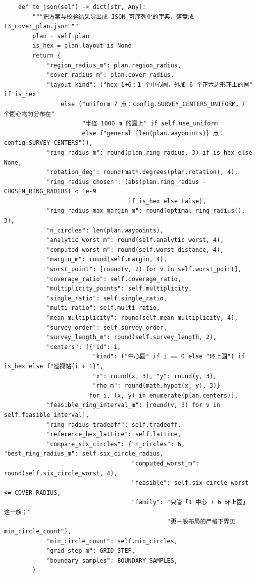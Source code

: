 \documentclass[UTF8, zihao=5,AutoFakeBold=2]{ctexart}
\begin{document}
\begin{lstlisting}
    def to_json(self) -> dict[str, Any]:
        """把方案与校验结果导出成 JSON 可序列化的字典，落盘成 t3_cover_plan.json"""
        plan = self.plan
        is_hex = plan.layout is None
        return {
            "region_radius_m": plan.region_radius,
            "cover_radius_m": plan.cover_radius,
            "layout_kind": ("hex 1+6：1 个中心圆，外加 6 个正六边形环上的圆" if is_hex
                else ("uniform 7 点：config.SURVEY_CENTERS_UNIFORM，7 个圆心均匀分布在"
                      "半径 1000 m 的圆上" if self.use_uniform
                      else f"general {len(plan.waypoints)} 点：config.SURVEY_CENTERS")),
            "ring_radius_m": round(plan.ring_radius, 3) if is_hex else None,
            "rotation_deg": round(math.degrees(plan.rotation), 4),
            "ring_radius_chosen": (abs(plan.ring_radius - CHOSEN_RING_RADIUS) < 1e-9
                                   if is_hex else False),
            "ring_radius_max_margin_m": round(optimal_ring_radius(), 3),
            "n_circles": len(plan.waypoints),
            "analytic_worst_m": round(self.analytic_worst, 4),
            "computed_worst_m": round(self.worst_distance, 4),
            "margin_m": round(self.margin, 4),
            "worst_point": [round(v, 2) for v in self.worst_point],
            "coverage_ratio": self.coverage_ratio,
            "multiplicity_points": self.multiplicity,
            "single_ratio": self.single_ratio,
            "multi_ratio": self.multi_ratio,
            "mean_multiplicity": round(self.mean_multiplicity, 4),
            "survey_order": self.survey_order,
            "survey_length_m": round(self.survey_length, 2),
            "centers": [{"id": i,
                         "kind": ("中心圆" if i == 0 else "环上圆") if is_hex else f"巡视站{i + 1}",
                         "x": round(x, 3), "y": round(y, 3),
                         "rho_m": round(math.hypot(x, y), 3)}
                        for i, (x, y) in enumerate(plan.centers)],
            "feasible_ring_interval_m": [round(v, 3) for v in self.feasible_interval],
            "ring_radius_tradeoff": self.tradeoff,
            "reference_hex_lattice": self.lattice,
            "compare_six_circles": {"n_circles": 6, "best_ring_radius_m": self.six_circle_radius,
                                    "computed_worst_m": round(self.six_circle_worst, 4),
                                    "feasible": self.six_circle_worst <= COVER_RADIUS,
                                    "family": "只管「1 中心 + 6 环上圆」这一族；"
                                              "更一般布局的严格下界见 min_circle_count"},
            "min_circle_count": self.min_circles,
            "grid_step_m": GRID_STEP,
            "boundary_samples": BOUNDARY_SAMPLES,
        }


\end{lstlisting}
\end{document}
